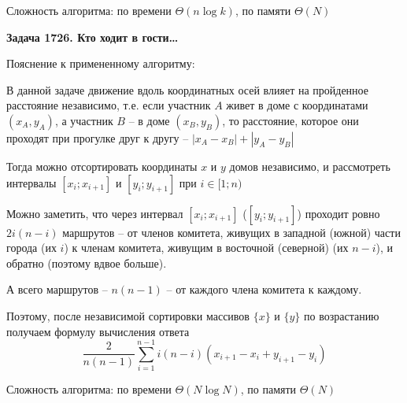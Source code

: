 \documentclass[12pt,a4paper]{article}
\begin{document}
    Сложность алгоритма: по времени $\Theta(n\log k)$, по памяти $\Theta(N)$

    \bigskip

    \textbf{Задача 1726. Кто ходит в гости\ldots}

    Пояснение к примененному алгоритму:

    В данной задаче движение вдоль координатных осей влияет на пройденное расстояние независимо,
    т.е. если участник $A$ живет в доме с координатами $(x_A,y_A)$, а участник $B$ -- в доме $(x_B,y_B)$,
    то расстояние, которое они проходят при прогулке друг к другу -- $|x_A-x_B|+|y_A-y_B|$

    Тогда можно отсортировать координаты $x$ и $y$ домов независимо, и рассмотреть интервалы
    $[x_i;x_{i+1}]$ и $[y_i;y_{i+1}]$ при $i\in[1;n)$

    Можно заметить, что через интервал $[x_i;x_{i+1}]$ ($[y_i;y_{i+1}]$) проходит ровно
    $2i(n-i)$ маршрутов -- от членов комитета, живущих в западной (южной) части города (их $i$) к членам комитета,
    живущим в восточной (северной) (их $n-i$), и обратно (поэтому вдвое больше).

    А всего маршрутов -- $n(n-1)$ -- от каждого члена комитета к каждому.

    Поэтому, после независимой сортировки массивов $\{x\}$ и $\{y\}$ по возрастанию получаем формулу вычисления ответа
    \[ \frac{2}{n(n-1)} \sum_{i=1}^{n-1} i(n-i) \left( x_{i+1}-x_i + y_{i+1}-y_i \right) \]

    Сложность алгоритма: по времени $\Theta(N\log N)$, по памяти $\Theta(N)$
\end{document}
